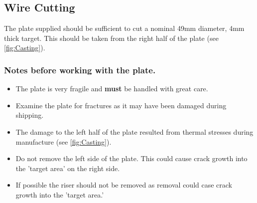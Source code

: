 \subsection{Wire Cutting}
The plate supplied should be sufficient to cut a nominal 49mm diameter, 4mm thick target. This should be taken from the right half of the plate (see \ref{fig:Casting}). 

\subsubsection{Notes before working with the plate.}
\begin{itemize}
\item The plate is very fragile and \textbf{must} be handled with great care. 
\item Examine the plate for fractures as it may have been damaged during shipping. 
\item The damage to the left half of the plate resulted from thermal stresses during manufacture (see \ref{fig:Casting}). 
\item Do not remove the left side of the plate. This could cause crack growth into the 'target area' on the right side.
\item If possible the riser should not be removed as removal could case crack growth into the 'target area.'
\end{itemize}